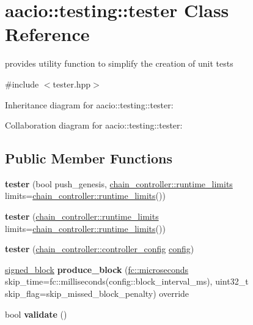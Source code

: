 \hypertarget{classaacio_1_1testing_1_1tester}{}\section{aacio\+:\+:testing\+:\+:tester Class Reference}
\label{classaacio_1_1testing_1_1tester}


provides utility function to simplify the creation of unit tests  




{\ttfamily \#include $<$tester.\+hpp$>$}



Inheritance diagram for aacio\+:\+:testing\+:\+:tester\+:


Collaboration diagram for aacio\+:\+:testing\+:\+:tester\+:
\subsection*{Public Member Functions}
\begin{DoxyCompactItemize}
\item 
\mbox{\label{classaacio_1_1testing_1_1tester_a28b296900fe8ce7db43a5bf4097a1de2}} 
{\bfseries tester} (bool push\+\_\+genesis, \mbox{\hyperlink{structaacio_1_1chain_1_1chain__controller_1_1runtime__limits}{chain\+\_\+controller\+::runtime\+\_\+limits}} limits=\mbox{\hyperlink{structaacio_1_1chain_1_1chain__controller_1_1runtime__limits}{chain\+\_\+controller\+::runtime\+\_\+limits}}())
\item 
\mbox{\label{classaacio_1_1testing_1_1tester_a966d8edd947a09dded83adf5eed55232}} 
{\bfseries tester} (\mbox{\hyperlink{structaacio_1_1chain_1_1chain__controller_1_1runtime__limits}{chain\+\_\+controller\+::runtime\+\_\+limits}} limits=\mbox{\hyperlink{structaacio_1_1chain_1_1chain__controller_1_1runtime__limits}{chain\+\_\+controller\+::runtime\+\_\+limits}}())
\item 
\mbox{\label{classaacio_1_1testing_1_1tester_a42cf042a7fe7dc17727150d8b144e0ff}} 
{\bfseries tester} (\mbox{\hyperlink{structaacio_1_1chain_1_1chain__controller_1_1controller__config}{chain\+\_\+controller\+::controller\+\_\+config}} \mbox{\hyperlink{classconfig}{config}})
\item 
\mbox{\label{classaacio_1_1testing_1_1tester_a7c994aac9c12e99548843615de2abe88}} 
\mbox{\hyperlink{structaacio_1_1chain_1_1signed__block}{signed\+\_\+block}} {\bfseries produce\+\_\+block} (\mbox{\hyperlink{classfc_1_1microseconds}{fc\+::microseconds}} skip\+\_\+time=fc\+::milliseconds(config\+::block\+\_\+interval\+\_\+ms), uint32\+\_\+t skip\+\_\+flag=skip\+\_\+missed\+\_\+block\+\_\+penalty) override
\item 
\mbox{\label{classaacio_1_1testing_1_1tester_ab7a9af4017e4e94b5ec7a32246635155}} 
bool {\bfseries validate} ()
\end{DoxyCompactItemize}
